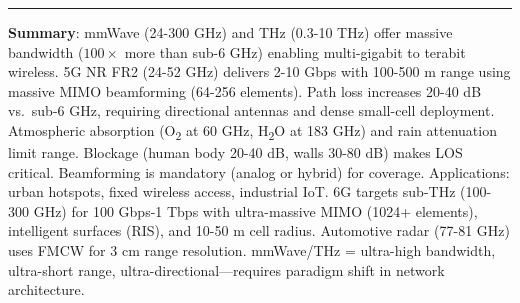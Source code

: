 \begin{center}\rule{0.5\linewidth}{0.5pt}\end{center}

\textbf{Summary}: mmWave (24-300 GHz) and THz (0.3-10 THz) offer massive
bandwidth ($100\times$ more than sub-6 GHz) enabling
multi-gigabit to terabit wireless. 5G NR FR2 (24-52 GHz) delivers 2-10
Gbps with 100-500 m range using massive MIMO beamforming (64-256
elements). Path loss increases 20-40 dB vs.~sub-6 GHz, requiring
directional antennas and dense small-cell deployment. Atmospheric
absorption (O\textsubscript{2} at 60 GHz,
H\textsubscript{2}O at 183 GHz) and rain attenuation
limit range. Blockage (human body 20-40 dB, walls 30-80 dB) makes LOS
critical. Beamforming is mandatory (analog or hybrid) for coverage.
Applications: urban hotspots, fixed wireless access, industrial IoT. 6G
targets sub-THz (100-300 GHz) for 100 Gbps-1 Tbps with ultra-massive
MIMO (1024+ elements), intelligent surfaces (RIS), and 10-50 m cell
radius. Automotive radar (77-81 GHz) uses FMCW for 3 cm range
resolution. mmWave/THz = ultra-high bandwidth, ultra-short range,
ultra-directional---requires paradigm shift in network architecture.
